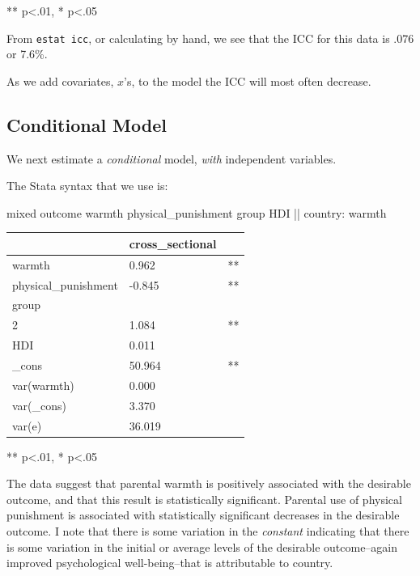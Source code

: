 \documentclass[
  letterpaper,
  DIV=11,
  numbers=noendperiod]{scrreprt}
\newenvironment{Shaded}{\begin{snugshade}}{\end{snugshade}}
\newcommand{\FunctionTok}[1]{\textcolor[rgb]{0.28,0.35,0.67}{#1}}
\newcommand{\NormalTok}[1]{\textcolor[rgb]{0.00,0.23,0.31}{#1}}
\begin{document}
** p\textless.01, * p\textless.05

From \texttt{estat\ icc}, or calculating by hand, we see that the ICC
for this data is .076 or 7.6\%.

As we add covariates, \(x\)'s, to the model the ICC will most often
decrease.

\hypertarget{conditional-model}{%
\subsection{Conditional Model}\label{conditional-model}}

We next estimate a \emph{conditional} model, \emph{with} independent
variables.

The Stata syntax that we use is:

\begin{Shaded}
\begin{Highlighting}[]

\NormalTok{mixed outcome warmth physical\_punishment }\FunctionTok{group}\NormalTok{ HDI || country: warmth}
\end{Highlighting}
\end{Shaded}

\begin{longtable}[]{@{}lll@{}}
\toprule\noalign{}
& cross\_sectional & \\
\midrule\noalign{}
\endhead
\bottomrule\noalign{}
\endlastfoot
warmth & 0.962 & ** \\
physical\_punishment & -0.845 & ** \\
group & & \\
2 & 1.084 & ** \\
HDI & 0.011 & \\
\_cons & 50.964 & ** \\
var(warmth) & 0.000 & \\
var(\_cons) & 3.370 & \\
var(e) & 36.019 & \\
\end{longtable}

** p\textless.01, * p\textless.05

The data suggest that parental warmth is positively associated with the
desirable outcome, and that this result is statistically significant.
Parental use of physical punishment is associated with statistically
significant decreases in the desirable outcome. I note that there is
some variation in the \emph{constant} indicating that there is some
variation in the initial or average levels of the desirable
outcome--again improved psychological well-being--that is attributable
to country.
\end{document}
